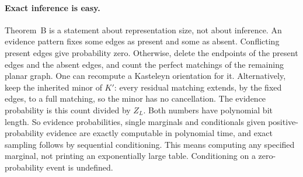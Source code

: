 \paragraph{Exact inference is easy.} Theorem~B is a statement about representation size, not about inference. An evidence pattern fixes some edges as present and some as absent. Conflicting present edges give probability zero. Otherwise, delete the endpoints of the present edges and the absent edges, and count the perfect matchings of the remaining planar graph. One can recompute a Kasteleyn orientation for it. Alternatively, keep the inherited minor of $K'$: every residual matching extends, by the fixed edges, to a full matching, so the minor has no cancellation. The evidence probability is this count divided by $Z_L$. Both numbers have polynomial bit length. So evidence probabilities, single marginals and conditionals given positive-probability evidence are exactly computable in polynomial time, and exact sampling follows by sequential conditioning. This means computing any specified marginal, not printing an exponentially large table. Conditioning on a zero-probability event is undefined.

